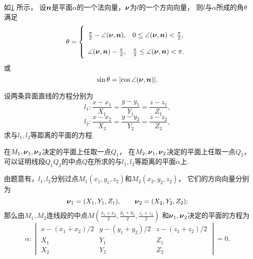 如\cref{figure:解析几何.直线与平面的夹角} 所示，
设\(\boldsymbol{n}\)是平面\(\alpha\)的一个法向量，\(\boldsymbol{\nu}\)为\(l\)的一个方向向量，
则\(l\)与\(\alpha\)所成的角\(\theta\)满足\[
	\theta = \left\{ \def\arraystretch{2} \begin{array}{ll}
		\frac{\pi}{2} - \angle(\mat{\nu},\mat{n}),
			& 0 \leq \angle(\mat{\nu},\mat{n}) < \frac{\pi}{2}, \\
		\angle(\mat{\nu},\mat{n}) - \frac{\pi}{2},
			& \frac{\pi}{2} \leq \angle(\mat{\nu},\mat{n}) < \pi.
	\end{array} \right.
\]
或\[
	\sin\theta = \abs{\cos\angle(\boldsymbol{\nu},\boldsymbol{n})}.
\]

\begin{figure}[hb]
	\centering
	\caption{}
	\label{figure:解析几何.直线与平面的夹角}
\end{figure}

\begin{example}
设两条异面直线的方程分别为\[
	l_1: \frac{x-x_1}{X_1} = \frac{y-y_1}{Y_1} = \frac{z-z_1}{Z_1},
\]\[
	l_2: \frac{x-x_2}{X_2} = \frac{y-y_2}{Y_2} = \frac{z-z_2}{Z_2},
\]
求与\(l_1,l_2\)等距离的平面的方程.
\begin{solution}
在\(M_1,\boldsymbol{\nu}_1,\boldsymbol{\nu}_2\)决定的平面上任取一点\(Q_1\)，
在\(M_2,\boldsymbol{\nu}_1,\boldsymbol{\nu}_2\)决定的平面上任取一点\(Q_2\)，
可以证明线段\(Q_1 Q_2\)的中点\(Q\)在所求的与\(l_1,l_2\)等距离的平面\(\alpha\)上.

由题意有，\(l_1,l_2\)分别过点\(M_1(x_1,y_1,z_2)\)和\(M_2(x_2,y_2,z_2)\)，
它们的方向向量分别为\[
	\boldsymbol{\nu}_1 = (X_1,Y_1,Z_1), \qquad
	\boldsymbol{\nu}_2 = (X_2,Y_2,Z_2);
\]
那么由\(M_1,M_2\)连线段的中点\(M\left(
	\frac{x_1+x_2}{2},
	\frac{y_1+y_2}{2},
	\frac{z_1+z_2}{2}
\right)\)
和\(\boldsymbol{\nu}_1,\boldsymbol{\nu}_2\)决定的平面的方程为\[
	\alpha: \begin{vmatrix}
		x - (x_1+x_2)/2 & y - (y_1+y_2)/2 & z - (z_1+z_2)/2 \\
		X_1 & Y_1 & Z_1 \\
		X_2 & Y_2 & Z_2
	\end{vmatrix} = 0.
\]
\end{solution}
\end{example}

